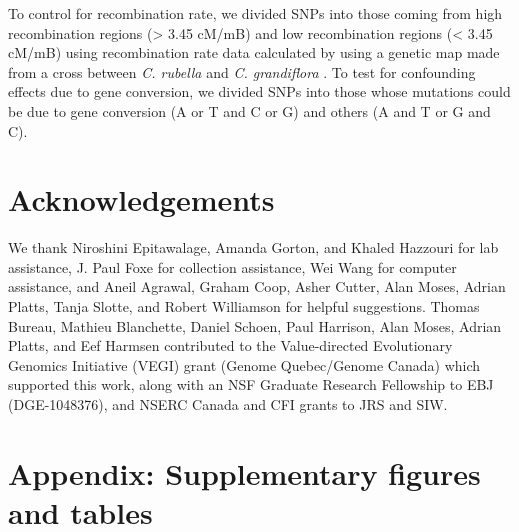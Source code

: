 To control for recombination rate, we divided SNPs into those coming from high recombination regions (> 3.45 cM/mB) and low recombination regions (< 3.45 cM/mB) using recombination rate data calculated by using a genetic map made from a cross between \textit{C. rubella} and \textit{C. grandiflora} \citep{Corbett-Detig2015-yo}. To test for confounding effects due to gene conversion, we divided SNPs into those whose mutations could be due to gene conversion (A or T and C or G) and others (A and T or G and C).

\section{Acknowledgements}
We thank Niroshini Epitawalage, Amanda Gorton, and Khaled Hazzouri for lab assistance, J. Paul Foxe for collection assistance, Wei Wang for computer assistance, and Aneil Agrawal, Graham Coop, Asher Cutter, Alan Moses, Adrian Platts, Tanja Slotte, and Robert Williamson for helpful suggestions. Thomas Bureau, Mathieu Blanchette, Daniel Schoen, Paul Harrison, Alan Moses, Adrian Platts, and Eef Harmsen contributed to the Value-directed Evolutionary Genomics Initiative (VEGI) grant (Genome Quebec/Genome Canada) which supported this work, along with an NSF Graduate Research Fellowship to EBJ (DGE-1048376), and NSERC Canada and CFI grants to JRS and SIW. 

\section{Appendix: Supplementary figures and tables}

